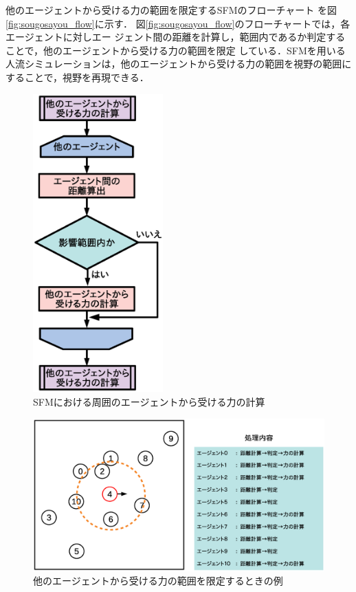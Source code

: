 他のエージェントから受ける力の範囲を限定するSFMのフローチャート
を図\ref{fig:sougosayou_flow}に示す．
図\ref{fig:sougosayou_flow}のフローチャートでは，各エージェントに対しエー
ジェント間の距離を計算し，範囲内であるか判定することで，他のエージェントから受ける力の範囲を限定
している．SFMを用いる人流シミュレーションは，他のエージェントから受ける力の範囲を視野の範囲に
することで，視野を再現できる．

\begin{figure}[t]
 \begin{center}
  \includegraphics[width=5cm,clip]{figure/agent_flow.eps}
  \caption{SFMにおける周囲のエージェントから受ける力の計算}
  \label{fig:sougo_hani_flow}
 \end{center}
\end{figure}



\begin{figure}[h]
 \begin{center}
  \includegraphics[width=11.5cm,clip]{figure/sougo_hani_image_r2.eps}
  \caption{他のエージェントから受ける力の範囲を限定するときの例}
  \label{fig:sougo_hani}
 \end{center}
\end{figure}



